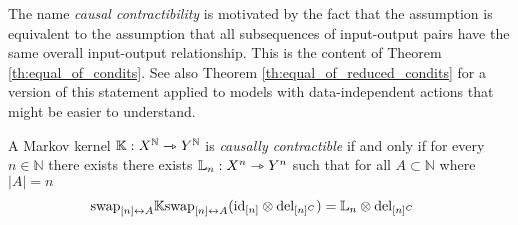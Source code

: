 The name \emph{causal contractibility} is motivated by the fact that the assumption is equivalent to the assumption that all subsequences of input-output pairs have the same overall input-output relationship. This is the content of Theorem \ref{th:equal_of_condits}. See also Theorem \ref{th:equal_of_reduced_condits} for a version of this statement applied to models with data-independent actions that might be easier to understand.

\begin{theorem}\label{th:equal_of_condits}
A Markov kernel $\mathbb{K}:X^{\mathbb{N}}\rightarrowtriangle Y^{\mathbb{N}}$ is \emph{causally contractible} if and only if for every $n\in \mathbb{N}$ there exists there exists $\mathbb{L}_n:X^n\rightarrowtriangle Y^n$ such that for all $A\subset \mathbb{N}$ where $|A|=n$
\begin{align}
    \text{swap}_{[n]\leftrightarrow A} \mathbb{K} \text{swap}_{[n]\leftrightarrow A} (\text{id}_{[n]}\otimes \text{del}_{[n]^C}) &= \mathbb{L}_n\otimes \mathrm{del}_{[n]^C}
\end{align}
\end{theorem}

